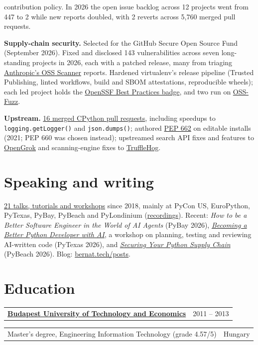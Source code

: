 \documentclass[10pt]{article}
\makeatletter
\newcommand{\twoColumns}[2]{%
  \noindent
  \begin{tabularx}{\textwidth}{@{}X r@{}}#2 & {\color{muted}#1}\\
  \end{tabularx}\par
}
\newcommand{\cvrule}{}
\makeatother
\begin{document}
\begin{points}
  contribution policy. In 2026 the open issue backlog across 12 projects went from 447 to 2 while new reports
  doubled, with 2 reverts across 5{,}760 merged pull requests.
\item \textbf{Supply-chain security.} Selected for the GitHub Secure Open Source Fund (September 2026). Fixed and
  disclosed 143 vulnerabilities across seven long-standing projects in 2026, each with a patched release, many from
  triaging \href{https://github.com/anthropics/oss-scanner}{Anthropic's OSS Scanner} reports. Hardened virtualenv's
  release pipeline (Trusted Publishing, linted workflows, build and SBOM attestations, reproducible wheels); each led
  project holds the \href{https://www.bestpractices.dev/en/projects/14689}{OpenSSF Best Practices badge}, and two run
  on \href{https://github.com/google/oss-fuzz}{OSS-Fuzz}.
\item \textbf{Upstream.}
  \href{https://github.com/python/cpython/pulls?q=is\%3Apr+author\%3Agaborbernat+is\%3Amerged}{16
  merged CPython pull requests},
  including speedups to \texttt{logging.getLogger()} and \texttt{json.dumps()}; authored %
  \href{https://peps.python.org/pep-0662/}{PEP 662} on editable installs (2021; PEP 660 was chosen instead);
  upstreamed search API fixes and features to
  \href{https://github.com/oracle/opengrok/pulls?q=is\%3Apr+author\%3Agaborbernat+is\%3Amerged}{OpenGrok}
  and scanning-engine fixes to
  \href{https://github.com/trufflesecurity/trufflehog/pulls?q=is\%3Apr+author\%3Agaborbernat+is\%3Amerged}{TruffleHog}.
\end{points}

\section*{Speaking and writing}
\cvrule%
\href{https://bernat.tech/talks}{21 talks, tutorials and workshops} since 2018, mainly at PyCon US,
EuroPython, PyTexas, PyBay,
PyBeach and PyLondinium (\href{https://www.youtube.com/playlist?list=PLYWe9Aw9Owsod3Orf-pDqABD--r7mlho7}{recordings}).
Recent: \emph{How to be a Better Software Engineer in the World of AI Agents} (PyBay 2026),
\emph{\href{https://github.com/gaborbernat/py-texas-26-workshop}{Becoming a Better Python Developer with AI}}, a
workshop on planning, testing and reviewing AI-written code (PyTexas 2026), and
\emph{\href{https://github.com/gaborbernat/pybeach-2026}{Securing Your Python Supply Chain}}
(PyBeach 2026). Blog: \href{https://bernat.tech/posts/}{bernat.tech/posts}.

\section*{Education}
\cvrule%
\twoColumns{2011 -- 2013}{ \textbf{\href{https://www.bme.hu/}{Budapest University of Technology and Economics}} }
\twoColumns{Hungary}{Master's degree, Engineering Information Technology (grade 4.57/5)}
\end{document}
